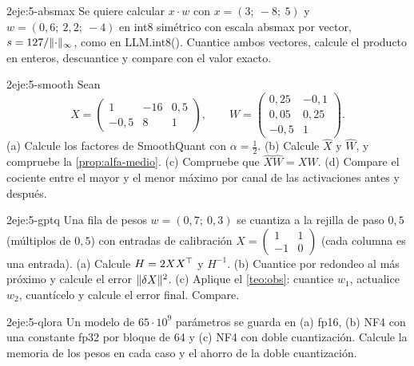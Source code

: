 \begin{ejercicio}{2}{eje:5-absmax}
Se quiere calcular $x\cdot w$ con $x=(3;\allowbreak\ -8;\allowbreak\ 5)$ y $w=(0{,}6;\allowbreak\ 2{,}2;\allowbreak\ -4)$ en int8 simétrico con escala absmax por vector, $s=127/\lVert\cdot\rVert_\infty$, como en LLM.int8(). Cuantice ambos vectores, calcule el producto en enteros, descuantice y compare con el valor exacto.
\end{ejercicio}

\begin{ejercicio}{2}{eje:5-smooth}
Sean
\[
X=\begin{pmatrix}1 & -16 & 0{,}5\\ -0{,}5 & 8 & 1\end{pmatrix},\qquad
W=\begin{pmatrix}0{,}25 & -0{,}1\\ 0{,}05 & 0{,}25\\ -0{,}5 & 1\end{pmatrix}.
\]
(a) Calcule los factores de SmoothQuant con $\alpha=\tfrac12$. (b) Calcule $\hat X$ y $\hat W$, y compruebe la \cref{prop:alfa-medio}. (c) Compruebe que $\hat X\hat W=XW$. (d) Compare el cociente entre el mayor y el menor máximo por canal de las activaciones antes y después.
\end{ejercicio}

\begin{ejercicio}{2}{eje:5-gptq}
Una fila de pesos $w=(0{,}7;\allowbreak\ 0{,}3)$ se cuantiza a la rejilla de paso $0{,}5$ (múltiplos de $0{,}5$) con entradas de calibración $X=\begin{pmatrix}1 & 1\\ -1 & 0\end{pmatrix}$ (cada columna es una entrada). (a) Calcule $H=2XX^{\top}$ y $H^{-1}$. (b) Cuantice por redondeo al más próximo y calcule el error $\lVert\delta X\rVert^{2}$. (c) Aplique el \cref{teo:obs}: cuantice $w_1$, actualice $w_2$, cuantícelo y calcule el error final. Compare.
\end{ejercicio}

\begin{ejercicio}{2}{eje:5-qlora}
Un modelo de $65\cdot 10^{9}$ parámetros se guarda en (a) fp16, (b) NF4 con una constante fp32 por bloque de 64 y (c) NF4 con doble cuantización. Calcule la memoria de los pesos en cada caso y el ahorro de la doble cuantización.
\end{ejercicio}

